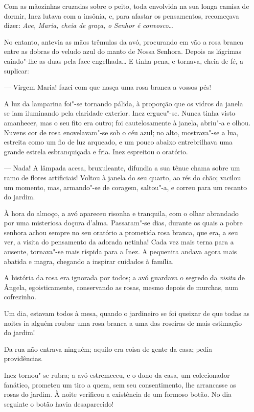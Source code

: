Com as mãozinhas cruzadas sobre o peito, toda envolvida na sua longa
camisa de dormir, Inez lutava com a insônia, e, para afastar os
pensamentos, recomeçava dizer: \emph{Ave, Maria, cheia de graça, o
Senhor é convosco}\ldots{}

No entanto, antevia as mãos trêmulas da avó, procurando em vão a rosa
branca entre as dobras do veludo azul do manto de Nossa Senhora. Depois
as lágrimas caindo"-lhe as duas pela face engelhada\ldots{} E tinha pena, e
tornava, cheia de fé, a suplicar:

--- Virgem Maria! fazei com que nasça uma rosa branca a vossos pés!

A luz da lamparina foi"-se tornando pálida, à proporção que os vidros da
janela se iam iluminando pela claridade exterior. Inez ergueu"-se. Nunca
tinha visto amanhecer, mas o seu fito era outro; foi cautelosamente à
janela, abriu"-a e olhou. Nuvens cor de rosa enovelavam"-se sob o céu
azul; no alto, mostrava"-se a lua, estreita como um fio de luz arqueado,
e um pouco abaixo entrebrilhava uma grande estrela esbranquiçada e fria.
Inez espreitou o oratório.

--- Nada! A lâmpada acesa, bruxuleante, difundia a sua tênue chama sobre
um ramo de flores artificiais! Voltou à janela do seu quarto, ao rés do
chão; vacilou um momento, mas, armando"-se de coragem, saltou"-a, e correu
para um recanto do jardim.

À hora do almoço, a avó apareceu risonha e tranquila, com o olhar
abrandado por uma misteriosa doçura d'alma. Passaram"-se dias, durante os
quais a pobre senhora achou sempre no seu oratório a prometida rosa
branca, que era, a seu ver, a visita do pensamento da adorada netinha!
Cada vez mais terna para a ausente, tornava"-se mais ríspida para a Inez.
A pequenita andava agora mais abatida e magra, chegando a inspirar
cuidados à família.

A história da rosa era ignorada por todos; a avó guardava o segredo da
\emph{visita} de Ângela, egoisticamente, conservando as rosas, mesmo
depois de murchas, num cofrezinho.

Um dia, estavam todos à mesa, quando o jardineiro se foi queixar de que
todas as noites ia alguém roubar uma rosa branca a uma das roseiras de
mais estimação do jardim!

Da rua não entrava ninguém; aquilo era coisa de gente da casa; pedia
providências.

Inez tornou"-se rubra; a avó estremeceu, e o dono da casa, um
colecionador fanático, prometeu um tiro a quem, sem seu consentimento,
lhe arrancasse as rosas do jardim. À noite verificou a existência de um
formoso botão. No dia seguinte o botão havia desaparecido!

